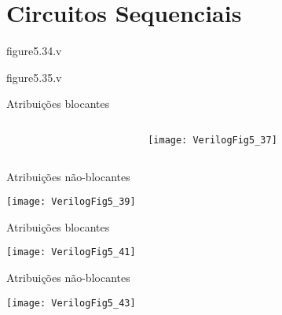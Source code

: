 

\subtitle{Circuitos Sequenciais: Implementação em Verilog} %



\begin{frame}
	\titlepage
\end{frame} 

\section{Circuitos Sequenciais}

\begin{frame}[fragile]{figure5.34.v}
\end{frame} 

\begin{frame}[fragile]{figure5.35.v}
\end{frame} 

\begin{frame}{Atribuições blocantes}
    \begin{columns}
        \begin{column}{0.60\textwidth}
        \end{column}    
        \pause
        \begin{column}{0.40\textwidth} \centering
            \texttt{[image: VerilogFig5\_37]} 
        \end{column}
    \end{columns}    
\end{frame}

\begin{frame}{Atribuições não-blocantes}
    \begin{multicols}{2}
            \texttt{[image: VerilogFig5\_39]} 
    \end{multicols}
\end{frame}

\begin{frame}{Atribuições blocantes} \centering
    \begin{multicols}{2}
        \texttt{[image: VerilogFig5\_41]} 
    \end{multicols}
\end{frame}

\begin{frame}{Atribuições não-blocantes}
    \begin{multicols}{2}
        \texttt{[image: VerilogFig5\_43]} 
    \end{multicols}
\end{frame}

